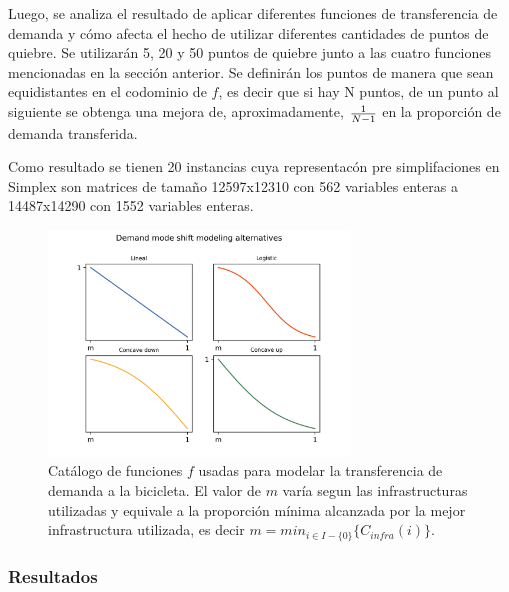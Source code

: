 \documentclass{article}
\begin{document}
  Luego, se analiza el resultado de aplicar diferentes funciones de transferencia de demanda y cómo afecta el hecho de utilizar diferentes cantidades de puntos de quiebre. Se utilizarán 5, 20 y 50 puntos de quiebre junto a las cuatro funciones mencionadas en la sección anterior. Se definirán los puntos de manera que sean equidistantes en el codominio de $f$, es decir que si hay N puntos, de un punto al siguiente se obtenga una mejora de, aproximadamente, ${1 \over N - 1}$ en la proporción de demanda transferida.

  Como resultado se tienen 20 instancias cuya representacón pre simplifaciones en Simplex son matrices de tamaño 12597x12310 con 562 variables enteras a 14487x14290 con 1552 variables enteras.

  \begin{figure}[h!]
    \centering
    \includegraphics[width=8cm]{../resources/f_catalog.png}
      \caption{Catálogo de funciones $f$ usadas para modelar la transferencia de demanda a la bicicleta. El valor de $m$ varía segun las infrastructuras utilizadas y equivale a la proporción mínima alcanzada por la mejor infrastructura utilizada, es decir $m = min_{i \in I - \{0\}} \{ C_{infra}(i) \}$.}
    \label{fig:fcatalog}
  \end{figure}

  \subsubsection*{Resultados}
\end{document}
